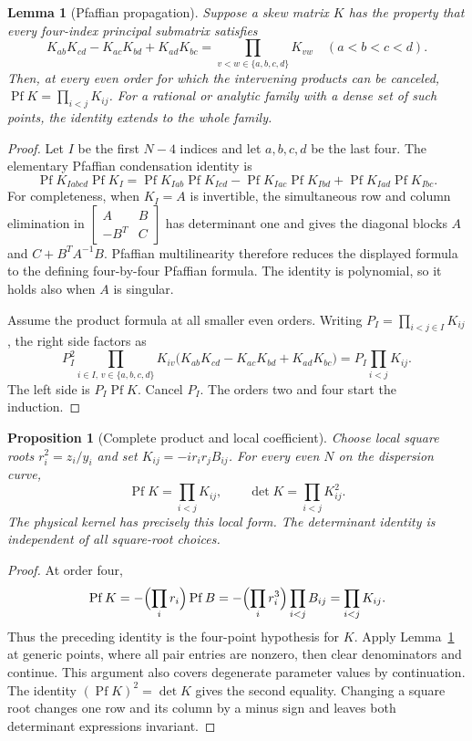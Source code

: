 \documentclass[11pt]{article}
\numberwithin{equation}{section}
\newtheorem{lemma}[theorem]{Lemma}
\newtheorem{proposition}[theorem]{Proposition}
\theoremstyle{remark}\newtheorem{remark}[theorem]{Remark}
\DeclareMathOperator{\Pf}{Pf}
\begin{document}
\begin{lemma}[Pfaffian propagation]\label{lem:pf-propagation}
Suppose a skew matrix $K$ has the property that every four-index
principal submatrix satisfies
\[
 K_{ab}K_{cd}-K_{ac}K_{bd}+K_{ad}K_{bc}
   =\prod_{v<w\in\{a,b,c,d\}}K_{vw}
 \quad(a<b<c<d).
\]
Then, at every even order for which the intervening products
can be canceled, $\operatorname{Pf}K=\prod_{i<j}K_{ij}$.
For a rational or analytic family with a dense set of such
points, the identity extends to the whole family.
\end{lemma}
\begin{proof}
Let $I$ be the first $N-4$ indices and let $a,b,c,d$ be the last
four.  The elementary Pfaffian condensation identity is
\[
 \operatorname{Pf}K_{Iabcd}\operatorname{Pf}K_I
 =\operatorname{Pf}K_{Iab}\operatorname{Pf}K_{Icd}
  -\operatorname{Pf}K_{Iac}\operatorname{Pf}K_{Ibd}
  +\operatorname{Pf}K_{Iad}\operatorname{Pf}K_{Ibc}.
\]
For completeness, when $K_I=A$ is invertible, the simultaneous
row and column elimination in
$\left[\begin{smallmatrix}A&B\\-B^T&C\end{smallmatrix}\right]$
has determinant one and gives the diagonal blocks
$A$ and $C+B^TA^{-1}B$.  Pfaffian multilinearity therefore
reduces the displayed formula to the defining four-by-four
Pfaffian formula.  The identity is polynomial, so it holds
also when $A$ is singular.

Assume the product formula at all smaller even orders.
Writing $P_I=\prod_{i<j\in I}K_{ij}$, the right side factors as
\[
 P_I^2\prod_{i\in I,\,v\in\{a,b,c,d\}}K_{iv}
 \bigl(K_{ab}K_{cd}-K_{ac}K_{bd}+K_{ad}K_{bc}\bigr)
 =P_I\prod_{i<j}K_{ij}.
\]
The left side is $P_I\operatorname{Pf}K$.  Cancel $P_I$.
The orders two and four start the induction.
\end{proof}

\begin{proposition}[Complete product and local coefficient]
\label{prop:complete-product}\label{prop:local-determinant-coefficient}
Choose local square roots $r_i^2=z_i/y_i$ and set
$K_{ij}=-ir_i r_j B_{ij}$.  For every even $N$ on the
dispersion curve,
\[
 \operatorname{Pf}K=\prod_{i<j}K_{ij},\qquad
 \det K=\prod_{i<j}K_{ij}^2.
\]
The physical kernel has precisely this local form.  The
determinant identity is independent of all square-root choices.
\end{proposition}
\begin{proof}
At order four,
\[
 \Pf K=-\Bigl(\prod_i r_i\Bigr)\Pf B
       =-\Bigl(\prod_i r_i^3\Bigr)\prod_{i<j}B_{ij}
       =\prod_{i<j}K_{ij}.
\]
Thus the preceding identity is the four-point hypothesis for $K$.  Apply Lemma~\ref{lem:pf-propagation} at
generic points, where all pair entries are nonzero, then clear
denominators and continue.  This argument also covers
degenerate parameter values by continuation.  The identity
$(\operatorname{Pf}K)^2=\det K$ gives the second equality.
Changing a square root changes one row and its column by a
minus sign and leaves both determinant expressions invariant.
\end{proof}
\end{document}
